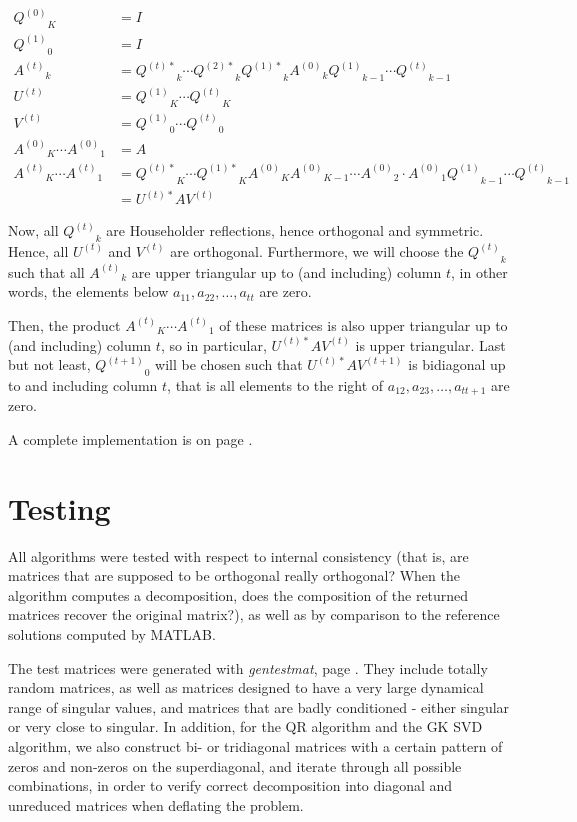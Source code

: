\documentclass[11pt]{article}
\renewcommand{\j}[2]{\ensuremath{#1^{(#2)}}}	%
\newcommand{\jt}[2]{\ensuremath{#1^{(#2)*}}}	%
\begin{document}
\begin{align*}
	\j Q0_K 	&= I 	\\
	\j Q1_0 	&= I	\\
	\j At_k 	&= \jt Qt_k \cdots \jt Q2_k \jt Q1_k \j A0_k \j Q1_{k-1} \cdots \j Qt_{k-1} \\
	\j Ut		&= \j Q1_K \cdots \j Qt_K \\
	\j Vt		&= \j Q1_0 \cdots \j Qt_0 \\
	\j A0_K \cdots \j A0_1 &= A \\
	\j At_K \cdots \j At_1 &= \jt Qt_K \cdots \jt Q1_K \j A0_K\j A0_{K-1}\cdots\j A0_2\cdot \j A0_1 \j Q1_{k-1} \cdots \j Qt_{k-1} \\
					&= \jt Ut A \j Vt
\end{align*}

Now, all $\j Qt_k$ are Householder reflections, hence orthogonal and symmetric. Hence, all \j Ut and \j Vt are orthogonal. Furthermore, we will choose the $\j Qt_k$ such that all $\j At_k$ are upper triangular up to (and including) column $t$, in other words, the elements below $a_{11}, a_{22}, \ldots, a_{tt}$ are zero.

Then, the product $\j At_K \cdots \j At_1$ of these matrices is also upper triangular up to (and including) column $t$, so in particular, $\jt Ut A \j Vt$ is upper triangular. Last but not least, $\j Q{t+1}_0$ will be chosen such that $\jt Ut A \j V{t+1}$ is bidiagonal up to and including column $t$, that is all elements to the right of $a_{12}, a_{23}, \ldots, a_{tt+1}$ are zero.

A complete implementation is on page \pageref{rc:bidigprod}.

\section{Testing}
All algorithms were tested with respect to internal consistency (that is, are matrices that are supposed to be orthogonal really orthogonal? When the algorithm computes a decomposition, does the composition of the returned matrices recover the original matrix?), as well as by comparison to the reference solutions computed by MATLAB. 

The test matrices were generated with \emph{gentestmat}, page \pageref{rc:gentestmat}. They include totally random matrices, as well as matrices designed to have a very large dynamical range of singular values, and matrices that are badly conditioned - either singular or very close to singular. In addition, for the QR algorithm and the GK SVD algorithm, we also construct bi- or tridiagonal matrices with a certain pattern of zeros and non-zeros on the superdiagonal, and iterate through all possible combinations, in order to verify correct decomposition into diagonal and unreduced matrices when deflating the problem.
\end{document}
